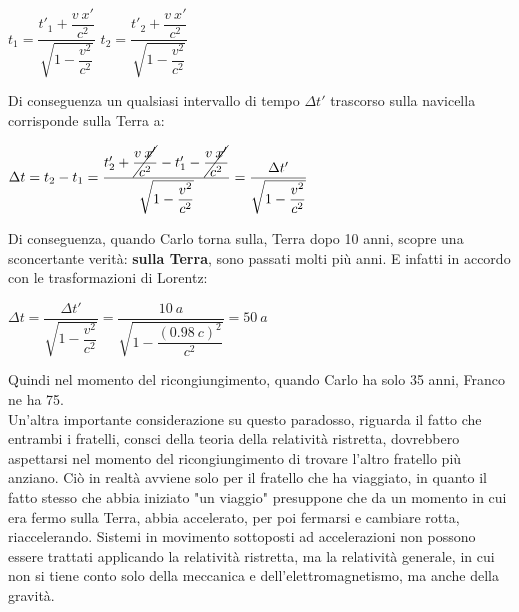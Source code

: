 \documentclass[a4paper,12pt]{report}
\begin{document}
\begin{center}
$t_1= \dfrac{t'_1 + \dfrac{v\:x'}{c^2}}{\sqrt{1-\dfrac{v^2}{c^2}}} $ \qquad \qquad
$t_2= \dfrac{t'_2 + \dfrac{v\:x'}{c^2}}{\sqrt{1-\dfrac{v^2}{c^2}}} $
\end{center}
Di conseguenza un qualsiasi intervallo di tempo $\Delta t'$ trascorso sulla navicella corrisponde sulla Terra a:
\begin{center}
$\Delta t = t_2 - t_1 = \dfrac{t'_2 + \cancel{\dfrac{v\:x'}{c^2}} - t'_1 - \cancel{\dfrac{v\:x'}{c^2}}}{\sqrt{1-\dfrac{v^2}{c^2}}} = \dfrac{\Delta t'}{\sqrt{1-\dfrac{v^2}{c^2}}}$
\end{center}

Di conseguenza, quando Carlo torna sulla, Terra dopo 10 anni, scopre una sconcertante verità: \textbf{sulla Terra}, sono passati molti più anni. E infatti in accordo con le trasformazioni di Lorentz: 
\begin{center}
$\Delta t = \dfrac{\Delta t'}{\sqrt{1-\dfrac{v^2}{c^2}}} = \dfrac{10\:a}{\sqrt{1 - \dfrac{(0.98\:c)^2}{c^2}}} = 50\:a$
\end{center}
Quindi nel momento del ricongiungimento, quando Carlo ha solo 35 anni, Franco ne ha 75.\\
Un'altra importante considerazione su questo paradosso, riguarda il fatto che entrambi i fratelli, consci della teoria della relatività ristretta, dovrebbero aspettarsi nel momento del ricongiungimento di trovare l'altro fratello più anziano. Ciò in realtà avviene solo per il fratello che ha viaggiato, in quanto il fatto stesso che abbia iniziato "un viaggio" presuppone che da un momento in cui era fermo sulla Terra, abbia accelerato, per poi fermarsi e cambiare rotta, riaccelerando. Sistemi in movimento sottoposti ad accelerazioni non possono essere trattati applicando la relatività ristretta, ma la relatività generale, in cui non si tiene conto solo della meccanica e dell’elettromagnetismo, ma anche della gravità.
\end{document}
